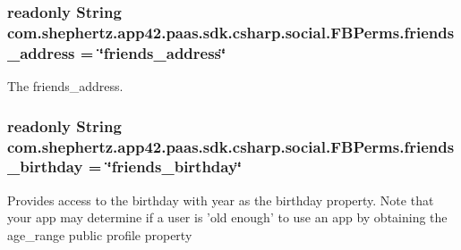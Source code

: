 \hypertarget{classcom_1_1shephertz_1_1app42_1_1paas_1_1sdk_1_1csharp_1_1social_1_1_f_b_perms_ab11486ef7c4a0898e099698e6fcf1e85}{
\subsubsection[{friends\+\_\+address}]{\setlength{\rightskip}{0pt plus 5cm}readonly String com.\+shephertz.\+app42.\+paas.\+sdk.\+csharp.\+social.\+F\+B\+Perms.\+friends\+\_\+address = \char`\"{}friends\+\_\+address\char`\"{}\hspace{0.3cm}{\ttfamily [static]}}}\label{classcom_1_1shephertz_1_1app42_1_1paas_1_1sdk_1_1csharp_1_1social_1_1_f_b_perms_ab11486ef7c4a0898e099698e6fcf1e85}


The friends\+\_\+address. 

\hypertarget{classcom_1_1shephertz_1_1app42_1_1paas_1_1sdk_1_1csharp_1_1social_1_1_f_b_perms_a1db8ae438b466e02d556ac1f0664f71c}{
\subsubsection[{friends\+\_\+birthday}]{\setlength{\rightskip}{0pt plus 5cm}readonly String com.\+shephertz.\+app42.\+paas.\+sdk.\+csharp.\+social.\+F\+B\+Perms.\+friends\+\_\+birthday = \char`\"{}friends\+\_\+birthday\char`\"{}\hspace{0.3cm}{\ttfamily [static]}}}\label{classcom_1_1shephertz_1_1app42_1_1paas_1_1sdk_1_1csharp_1_1social_1_1_f_b_perms_a1db8ae438b466e02d556ac1f0664f71c}


Provides access to the birthday with year as the birthday property. Note that your app may determine if a user is 'old enough' to use an app by obtaining the age\+\_\+range public profile property 

